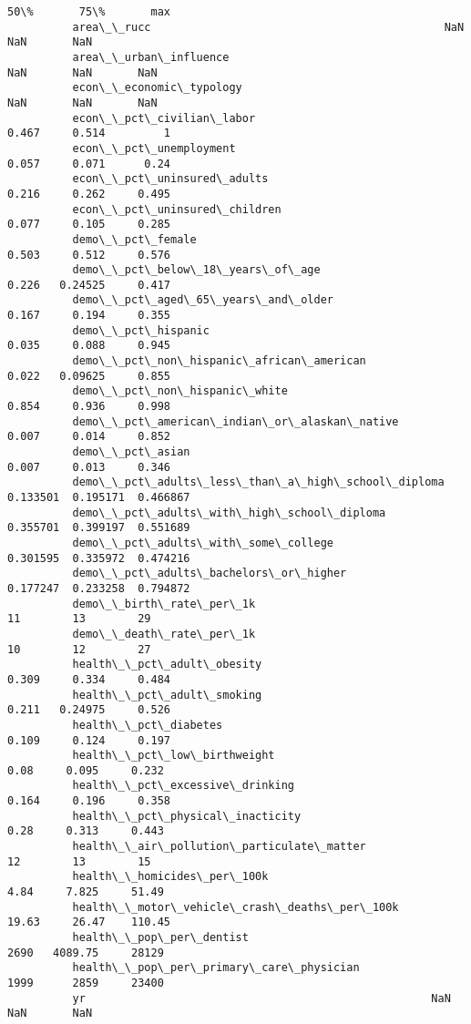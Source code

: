 \documentclass[11pt]{article}
\begin{document}
\begin{Verbatim}[commandchars=\\\{\}]
                                                                 50\%       75\%       max  
          area\_\_rucc                                             NaN       NaN       NaN  
          area\_\_urban\_influence                                  NaN       NaN       NaN  
          econ\_\_economic\_typology                                NaN       NaN       NaN  
          econ\_\_pct\_civilian\_labor                             0.467     0.514         1  
          econ\_\_pct\_unemployment                               0.057     0.071      0.24  
          econ\_\_pct\_uninsured\_adults                           0.216     0.262     0.495  
          econ\_\_pct\_uninsured\_children                         0.077     0.105     0.285  
          demo\_\_pct\_female                                     0.503     0.512     0.576  
          demo\_\_pct\_below\_18\_years\_of\_age                      0.226   0.24525     0.417  
          demo\_\_pct\_aged\_65\_years\_and\_older                    0.167     0.194     0.355  
          demo\_\_pct\_hispanic                                   0.035     0.088     0.945  
          demo\_\_pct\_non\_hispanic\_african\_american              0.022   0.09625     0.855  
          demo\_\_pct\_non\_hispanic\_white                         0.854     0.936     0.998  
          demo\_\_pct\_american\_indian\_or\_alaskan\_native          0.007     0.014     0.852  
          demo\_\_pct\_asian                                      0.007     0.013     0.346  
          demo\_\_pct\_adults\_less\_than\_a\_high\_school\_diploma  0.133501  0.195171  0.466867  
          demo\_\_pct\_adults\_with\_high\_school\_diploma         0.355701  0.399197  0.551689  
          demo\_\_pct\_adults\_with\_some\_college                0.301595  0.335972  0.474216  
          demo\_\_pct\_adults\_bachelors\_or\_higher              0.177247  0.233258  0.794872  
          demo\_\_birth\_rate\_per\_1k                                 11        13        29  
          demo\_\_death\_rate\_per\_1k                                 10        12        27  
          health\_\_pct\_adult\_obesity                            0.309     0.334     0.484  
          health\_\_pct\_adult\_smoking                            0.211   0.24975     0.526  
          health\_\_pct\_diabetes                                 0.109     0.124     0.197  
          health\_\_pct\_low\_birthweight                           0.08     0.095     0.232  
          health\_\_pct\_excessive\_drinking                       0.164     0.196     0.358  
          health\_\_pct\_physical\_inacticity                       0.28     0.313     0.443  
          health\_\_air\_pollution\_particulate\_matter                12        13        15  
          health\_\_homicides\_per\_100k                            4.84     7.825     51.49  
          health\_\_motor\_vehicle\_crash\_deaths\_per\_100k          19.63     26.47    110.45  
          health\_\_pop\_per\_dentist                               2690   4089.75     28129  
          health\_\_pop\_per\_primary\_care\_physician                1999      2859     23400  
          yr                                                     NaN       NaN       NaN  
\end{Verbatim}
            
\end{document}
